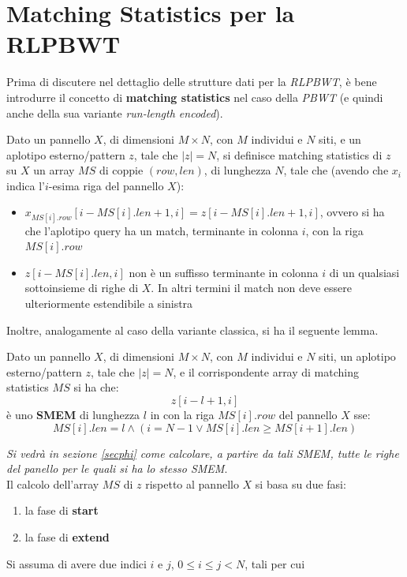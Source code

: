 \section{Matching Statistics per la RLPBWT}
Prima di discutere nel dettaglio delle strutture dati per la \textit{RLPBWT}, è
bene introdurre il 
concetto di \textbf{matching statistics} nel caso della \textit{PBWT} (e quindi
anche della sua variante \textit{run-length encoded}).
\begin{definizione}
  Dato un pannello $X$, di dimensioni $M\times N$, con $M$ individui e $N$ siti,
  e un aplotipo esterno/pattern $z$, tale che $|z|=N$, si definisce matching
  statistics di $z$ su $X$ un array $MS$ di coppie $(row,len)$, di lunghezza
  $N$, tale che (avendo che $x_i$ indica l'$i$-esima riga del pannello $X$): 
  \begin{itemize}
    \item $x_{MS[i].row}[i-MS[i].len+1,i]=z[i-MS[i].len+1,i]$, ovvero si ha che
    l'aplotipo query ha un match, terminante in colonna $i$, con la riga
    $MS[i].row$  
    \item $z[i-MS[i].len,i]$ non è un suffisso terminante in colonna $i$ di un
    qualsiasi sottoinsieme di righe di $X$. In altri termini il match non deve
    essere ulteriormente estendibile a sinistra
  \end{itemize}
\end{definizione}
Inoltre, analogamente al caso della variante classica, si ha il seguente lemma.
\begin{lemma}
  Dato un pannello $X$, di dimensioni $M\times N$, con $M$ individui e $N$
  siti, un aplotipo esterno/pattern $z$, tale che $|z|=N$, e il corrispondente
  array di matching statistics $MS$ si ha che:
  \[z[i-l+1,i]\]
  è uno \textbf{SMEM} di lunghezza $l$ in con la riga $MS[i].row$ del pannello
  $X$ sse: 
  \[MS[i].len=l\land(i=N-1\lor MS[i].len\geq MS[i+1].len)\]
\end{lemma}
\textit{Si vedrà in sezione \ref{secphi} come calcolare, a partire da tali
  \emph{SMEM}, tutte le righe del panello per le quali si ha lo stesso
  \emph{SMEM}}.\\
Il calcolo dell'array $MS$ di $z$ rispetto al pannello $X$ si basa su due fasi:
\begin{enumerate}
  \item la fase di \textbf{start}
  \item la fase di \textbf{extend}
\end{enumerate}
Si assuma di avere due indici $i$ e $j$, $0\leq i\leq j< N$, tali per cui
